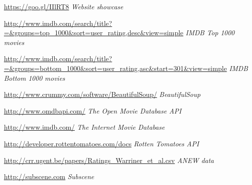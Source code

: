 \documentclass{acm_proc_article-sp}
\begin{document}


\begin{thebibliography}{9}

\url{https://goo.gl/IIlRT8}
\textit{Website showcase}

\url{http://www.imdb.com/search/title?=&groups=top_1000&sort=user_rating,desc&view=simple}
\textit{IMDB Top 1000 movies}

\url{http://www.imdb.com/search/title?=&groups=bottom_1000&sort=user_rating,asc&start=301&view=simple}
\textit{IMDB Bottom 1000 movies}

\url{http://www.crummy.com/software/BeautifulSoup/}
\textit{BeautifulSoup}

\url{http://www.omdbapi.com/}
\textit{The Open Movie Database API}

\url{http://www.imdb.com/}
\textit{The Internet Movie Database}

\url{http://developer.rottentomatoes.com/docs}
\textit{Rotten Tomatoes API}

\url{http://crr.ugent.be/papers/Ratings_Warriner_et_al.csv}
\textit{ANEW data}

\url{http://subscene.com}
\textit{Subscene}

\end{thebibliography}
\end{document}
